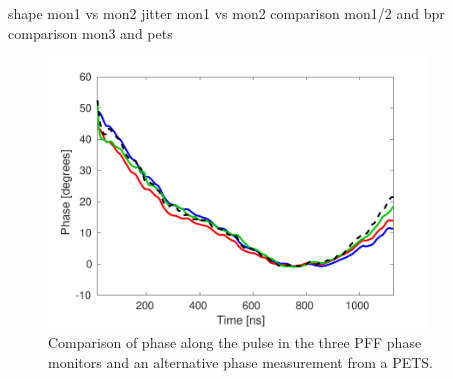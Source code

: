 
shape mon1 vs mon2
jitter mon1 vs mon2
comparison mon1/2 and bpr
comparison mon3 and pets

\begin{figure}
  \centering
  \includegraphics[width=0.9\textwidth]{Figures/phaseMons/phaseAlongAll}
  \caption{Comparison of phase along the pulse in the three PFF phase monitors and an alternative phase measurement from a PETS.}
  \label{f:phaseAlongAll}
\end{figure}


